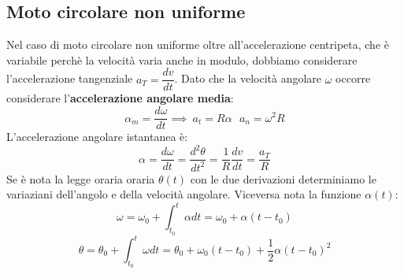 \documentclass[../../main.tex]{subfiles}
\begin{document}
\subsection{Moto circolare non uniforme}
Nel caso di moto circolare non uniforme oltre all'accelerazione centripeta, che è variabile perchè la velocità varia anche in modulo, dobbiamo considerare l'accelerazione tangenziale $a_T = \dfrac{dv}{dt}$. Dato che la velocità angolare $\omega$ occorre considerare l'\textbf{accelerazione angolare media}:
\[
    \alpha_m = \dfrac{d\omega}{dt} \implies \ a_t = R\alpha \ \ \ a_n = \omega^2R
\]
L'accelerazione angolare istantanea è:
\[
    \alpha = \dfrac{d\omega}{dt} = \dfrac{d^2\theta}{dt^2} = \dfrac{1}{R}\dfrac{dv}{dt} = \dfrac{a_T}{R}
\]
Se è nota la legge oraria oraria $\theta(t)$ con le due derivazioni determiniamo le variaziani dell'angolo e della velocità angolare. Viceversa nota la funzione $\alpha(t)$:
\[
    \omega = \omega_0 + \int_{t_0}^{t} \alpha dt = \omega_0 + \alpha(t - t_0)
\]
\[
    \theta = \theta_0 + \int_{t_0}^{t} \omega dt = \theta_0 + \omega_0(t - t_0) + \dfrac{1}{2}\alpha(t - t_0)^2
\]
\end{document}
